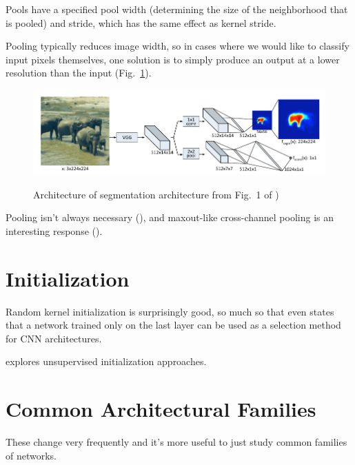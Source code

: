 \documentclass{article}
\begin{document}
Pools have a specified pool width (determining the size of the neighborhood that is pooled) and stride, which has the same effect as kernel stride.

Pooling typically reduces image width, so in cases where we would like to classify input pixels themselves, one solution is to simply produce an output at a lower resolution than the input (Fig.~\ref{fig:pinheiro}).

\begin{figure}[!h]
\centering
{\includegraphics[width=\textwidth]{pinheiro.pdf}}
\caption{Architecture of segmentation architecture from Fig.~1 of )}
\label{fig:pinheiro}
\end{figure}

Pooling isn't always necessary (), and maxout-like cross-channel pooling is an interesting response ().

\section{Initialization}

Random kernel initialization is surprisingly good, so much so that  even states that a network trained only on the last layer can be used as a selection method for CNN architectures.

 explores unsupervised initialization approaches.

\section{Common Architectural Families}

These change very frequently and it's more useful to just study common families of networks. 
\end{document}
